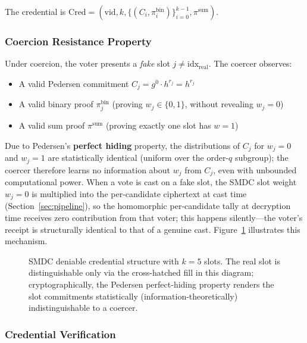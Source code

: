 The credential is $\text{Cred} = (\text{vid}, k, \{(C_i, \pi_i^{\text{bin}})\}_{i=0}^{k-1}, \pi^{\text{sum}})$.

\subsubsection{Coercion Resistance Property}
\label{subsubsec:smdc-coercion}

Under coercion, the voter presents a \emph{fake} slot $j \neq \text{idx}_{\text{real}}$. The coercer observes:
\begin{itemize}
    \item A valid Pedersen commitment $C_j = g^0 \cdot h^{r_j} = h^{r_j}$
    \item A valid binary proof $\pi_j^{\text{bin}}$ (proving $w_j \in \{0, 1\}$, without revealing $w_j = 0$)
    \item A valid sum proof $\pi^{\text{sum}}$ (proving exactly one slot has $w = 1$)
\end{itemize}

Due to Pedersen's \textbf{perfect hiding} property, the distributions of $C_j$ for $w_j = 0$ and $w_j = 1$ are statistically identical (uniform over the order-$q$ subgroup); the coercer therefore learns no information about $w_j$ from $C_j$, even with unbounded computational power. When a vote is cast on a fake slot, the SMDC slot weight $w_j = 0$ is multiplied into the per-candidate ciphertext at cast time (Section~\ref{sec:pipeline}), so the homomorphic per-candidate tally at decryption time receives zero contribution from that voter; this happens silently---the voter's receipt is structurally identical to that of a genuine cast. Figure~\ref{fig:smdc} illustrates this mechanism.

\begin{figure}[H]
\centering
\resizebox{\textwidth}{!}{}
\caption[SMDC Deniable Credential Slot Structure]{SMDC deniable credential structure with $k=5$ slots. The real slot is distinguishable only via the cross-hatched fill in this diagram; cryptographically, the Pedersen perfect-hiding property renders the slot commitments statistically (information-theoretically) indistinguishable to a coercer.}
\label{fig:smdc}
\end{figure}

\subsubsection{Credential Verification}
\label{subsubsec:smdc-verify}

